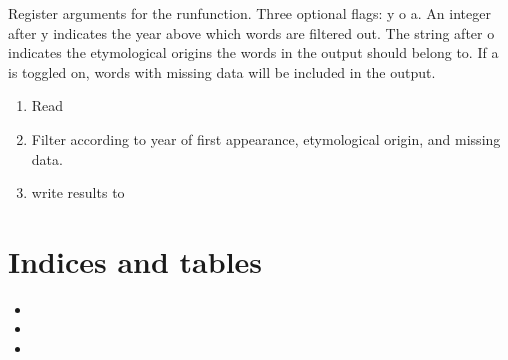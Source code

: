 \documentclass[letterpaper,10pt,english]{sphinxmanual}
\begin{document}

\begin{fulllineitems}
\label{\detokenize{filter:gerstnerhungariancommands.filter.register}}
\pysigstartsignatures
{}
\pysigstopsignatures
\sphinxAtStartPar
Register arguments for the run\sphinxhyphen{}function. Three optional flags: \sphinxhyphen{}y \sphinxhyphen{}o \sphinxhyphen{}a.
An integer after \sphinxhyphen{}y indicates the year above which words are filtered out.
The string after \sphinxhyphen{}o indicates the etymological origins the words in the
output should belong to. If \sphinxhyphen{}a is toggled on, words with missing data
will be included in the output.

\end{fulllineitems}


\begin{fulllineitems}
\label{\detokenize{filter:gerstnerhungariancommands.filter.run}}
\pysigstartsignatures
{}
\pysigstopsignatures\begin{enumerate}
%
\item {} 
\sphinxAtStartPar
Read 

\item {} 
\sphinxAtStartPar
Filter according to year of first appearance, etymological origin,
and missing data.

\item {} 
\sphinxAtStartPar
write results to 

\end{enumerate}

\end{fulllineitems}



\chapter{Indices and tables}
\label{\detokenize{index:indices-and-tables}}\begin{itemize}
\item {} 
\sphinxAtStartPar
{}

\item {} 
\sphinxAtStartPar
{}

\item {} 
\sphinxAtStartPar
{}

\end{itemize}
\end{document}
